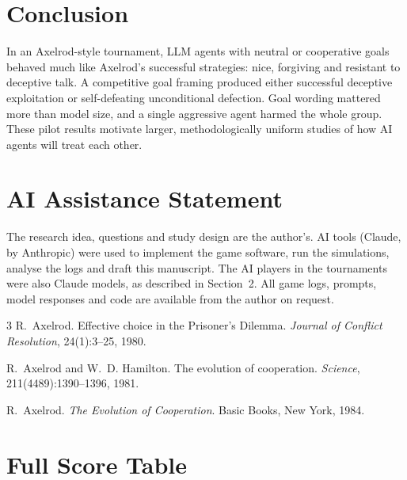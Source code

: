 \documentclass[11pt,a4paper]{article}
\begin{document}
\section{Conclusion}

In an Axelrod-style tournament, LLM agents with neutral or cooperative goals behaved much like Axelrod's successful strategies: nice, forgiving and resistant to deceptive talk. A competitive goal framing produced either successful deceptive exploitation or self-defeating unconditional defection. Goal wording mattered more than model size, and a single aggressive agent harmed the whole group. These pilot results motivate larger, methodologically uniform studies of how AI agents will treat each other.

\section*{AI Assistance Statement}
The research idea, questions and study design are the author's. AI tools (Claude, by Anthropic) were used to implement the game software, run the simulations, analyse the logs and draft this manuscript. The AI players in the tournaments were also Claude models, as described in Section~2. All game logs, prompts, model responses and code are available from the author on request.

\begin{thebibliography}{3}
R.~Axelrod.
\newblock Effective choice in the Prisoner's Dilemma.
\newblock \emph{Journal of Conflict Resolution}, 24(1):3--25, 1980.

R.~Axelrod and W.~D. Hamilton.
\newblock The evolution of cooperation.
\newblock \emph{Science}, 211(4489):1390--1396, 1981.

R.~Axelrod.
\newblock \emph{The Evolution of Cooperation}.
\newblock Basic Books, New York, 1984.
\end{thebibliography}

\appendix
\section{Full Score Table}
\label{app:scores}
\end{document}
